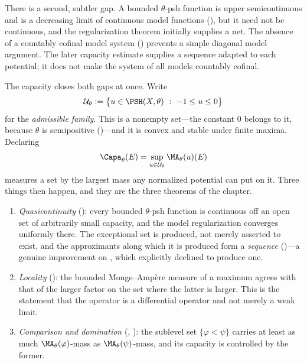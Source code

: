 There is a second, subtler gap.  A bounded $\theta$-psh function is upper
semicontinuous and is a decreasing limit of continuous model functions
(), but it need not be continuous,
and the regularization theorem initially supplies a net.
The absence of a countably cofinal model system
() prevents a simple diagonal model
argument.  The later capacity estimate supplies a sequence adapted to each
potential; it does not make the system of all models countably cofinal.

The capacity closes both gaps at once.  Write
\begin{equation}
\label{eq:ch25-admissible}
 \mathcal U_\theta
 :=\bigl\{u\in\PSH(X,\theta)\ :\ -1\leq u\leq0\bigr\}
\end{equation}
for the \emph{admissible family}.  This is a nonempty set---the constant
$0$ belongs to it, because $\theta$ is semipositive
()---and it is convex and stable under finite
maxima.  Declaring
\[
              \Capa_\theta(E)=\sup_{u\in\mathcal U_\theta}\MA_\theta(u)(E)
\]
measures a set by the largest mass any normalized potential can put on it.
Three things then happen, and they are the three theorems of the chapter.

\begin{enumerate}
\item\label{itm:ch25-plan:qc}
 \emph{Quasicontinuity} (): every bounded
 $\theta$-psh function is continuous off an open set of arbitrarily small
 capacity, and the model regularization converges uniformly there.  The
 exceptional set is produced, not merely asserted to exist, and the
 approximants along which it is produced form a \emph{sequence}
 ()---a genuine improvement on
 , which explicitly declined
 to produce one.
\item\label{itm:ch25-plan:loc}
 \emph{Locality} (): the bounded
 Monge--Amp\`ere measure of a maximum agrees with that of the larger factor
 on the set where the latter is larger.  This is the statement that the
 operator is a differential operator and not merely a weak limit.
\item\label{itm:ch25-plan:cmp}
 \emph{Comparison and domination}
 (,
 ): the sublevel set
 $\{\varphi<\psi\}$ carries at least as much $\MA_\theta(\varphi)$-mass
 as $\MA_\theta(\psi)$-mass, and its capacity is controlled by the former.
\end{enumerate}

